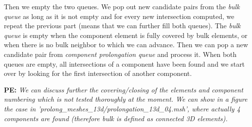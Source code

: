 \documentclass{elsarticle}
\newcommand{\notePE}[1]{{\color{Orange} \textbf{PE: } \textit{#1}}}
\begin{document}


Then we empty the two queues. 
We pop out new candidate pairs from the \emph{bulk queue} as long as it is not empty and for every new intersection computed, we repeat the previous part (means that we can further fill both queues).
The \emph{bulk queue} is empty when the component element is fully covered by bulk elements, or
when there is no bulk neighbor to which we can advance.
Then we can pop a new candidate pair from \emph{component prolongation queue} and process it.
When both queues are empty, all intersections of a component have been found and we start over by looking for the first intersection of another component.

\notePE{We can discuss further the covering/closing of the elements and component numbering which is not tested
thoroughly at the moment. We can show in a figure the case in 'prolong\_meshes\_13d/prolongation\_13d\_04.msh', where actually 4 components are found (therefore bulk is defined as connected 3D elements).}

\end{document}
